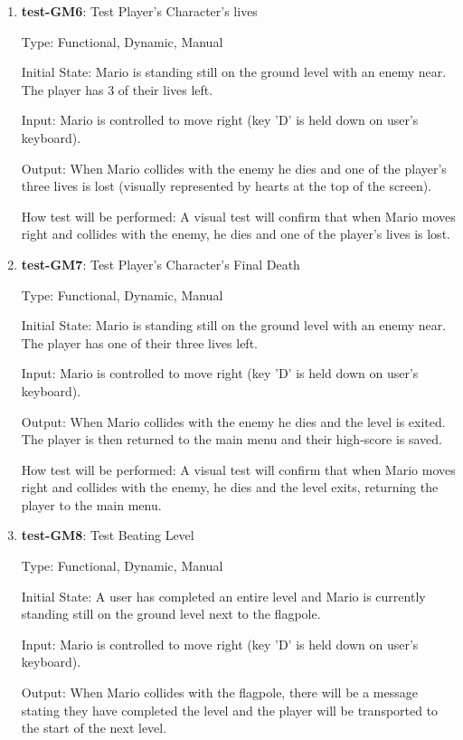\documentclass[12pt, titlepage]{article}
\begin{document}
\begin{enumerate}
\item{\textbf{test-GM6}: Test Player's Character's lives\\}

Type: Functional, Dynamic, Manual

Initial State: Mario is standing still on the ground level with an enemy near. The player has 3 of their lives left.

Input: Mario is controlled to move right (key 'D' is held down on user's keyboard).

Output: When Mario collides with the enemy he dies and one of the player's three lives is lost (visually represented by hearts at the top of the screen).

How test will be performed: A visual test will confirm that when Mario moves right and collides with the enemy, he dies and one of the player's lives is lost.

\item{\textbf{test-GM7}: Test Player's Character's Final Death\\}

Type: Functional, Dynamic, Manual

Initial State: Mario is standing still on the ground level with an enemy near. The player has one of their three lives left.

Input: Mario is controlled to move right (key 'D' is held down on user's keyboard).

Output: When Mario collides with the enemy he dies and the level is exited. The player is then returned to the main menu and their high-score is saved.

How test will be performed: A visual test will confirm that when Mario moves right and collides with the enemy, he dies and the level exits, returning the player to the main menu.

\item{\textbf{test-GM8}: Test Beating Level\\}

Type: Functional, Dynamic, Manual

Initial State: A user has completed an entire level and Mario is currently standing still on the ground level next to the flagpole.

Input: Mario is controlled to move right (key 'D' is held down on user's keyboard).

Output: When Mario collides with the flagpole, there will be a message stating they have completed the level and the player will be transported to the start of the next level.


\end{enumerate}
\end{document}
